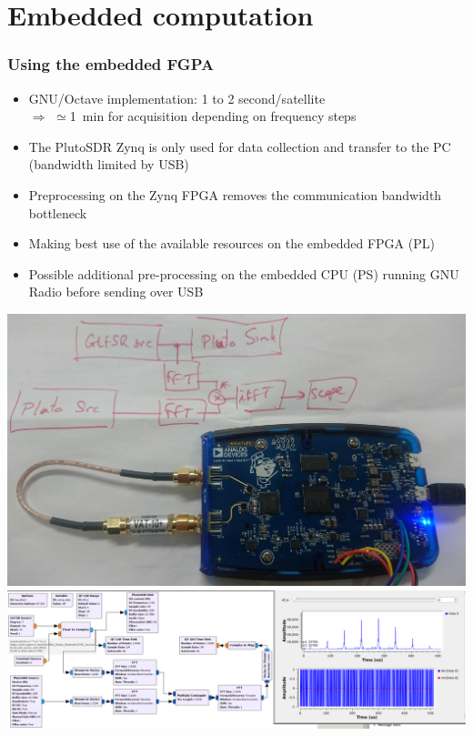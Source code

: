 \documentclass[compress,10pt]{beamer}
\begin{document}
\section{Embedded computation}
\begin{frame}[fragile]\frametitle{Using the embedded FGPA}

\begin{itemize}
\item
GNU/Octave implementation: 1 to 2 second/satellite \\
$\Rightarrow$ $\simeq$1~min for acquisition depending on frequency steps
\item The PlutoSDR Zynq is only used for data collection and transfer to the PC (bandwidth
limited by USB)
\item Preprocessing on the Zynq FPGA removes the communication bandwidth bottleneck
\item Making best use of the available resources on the embedded FPGA (PL)
\item Possible additional pre-processing on the embedded CPU (PS) running GNU Radio before sending
over USB
\end{itemize}

\includegraphics[width=.31\linewidth]{../images/DSC_0275.JPG}
\includegraphics[width=.68\linewidth]{../images/xcorr_pluto2}
\end{frame}
\end{document}
